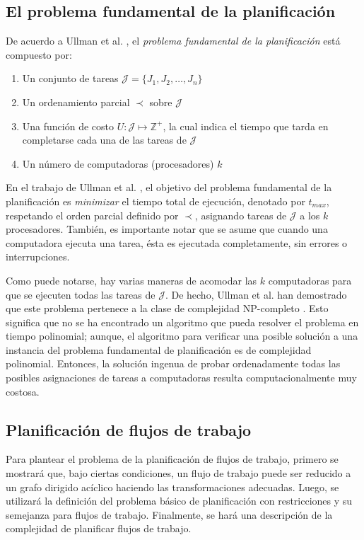 \subsection{El problema fundamental de la planificación}
De acuerdo a  Ullman et al. \cite{ullman1975np}, el \emph{problema fundamental de la planificación} está compuesto por:
 
\begin{enumerate}
\item Un conjunto de tareas $\mathcal{J} = \{ J_1, J_2, \dots, J_n \}$
\item Un ordenamiento parcial $\prec$ sobre $\mathcal{J}$
\item Una función de costo $U: \mathcal{J} \mapsto \mathbb{Z}^{+}$, la cual indica el tiempo que tarda en completarse cada una de las tareas de $\mathcal{J}$
\item Un número de computadoras (procesadores) $k$
\end{enumerate}

En el trabajo de Ullman et al. \cite{ullman1975np}, el objetivo del problema fundamental de la planificación es \emph{minimizar} el tiempo total de ejecución, denotado por $t_{max}$, respetando el orden parcial definido por $\prec$, asignando tareas de $\mathcal{J}$ a los $k$ procesadores. También, es importante notar que se asume que cuando una computadora ejecuta una tarea, ésta es ejecutada completamente, sin errores o interrupciones.

Como puede notarse, hay varias maneras de acomodar las $k$ computadoras para que se ejecuten todas las tareas de $\mathcal{J}$. De hecho, Ullman et al. han demostrado que este problema pertenece a la clase de complejidad NP-completo \cite{ullman1975np}. Esto significa que no se ha encontrado un algoritmo que pueda resolver el problema en tiempo polinomial; aunque, el algoritmo para verificar una posible solución a una instancia del problema fundamental de planificación es de complejidad polinomial. Entonces, la solución ingenua de probar ordenadamente todas las posibles asignaciones de tareas a computadoras resulta computacionalmente muy costosa.


\subsection{Planificación de flujos de trabajo}

Para plantear el problema de la planificación de flujos de trabajo, primero se mostrará que, bajo ciertas condiciones, un flujo de trabajo puede ser reducido a un grafo dirigido acíclico haciendo las transformaciones adecuadas. Luego, se utilizará la definición del problema básico de planificación con restricciones y su semejanza para flujos de trabajo. Finalmente, se hará una descripción de la complejidad de planificar flujos de trabajo.


